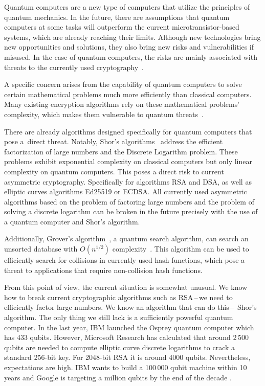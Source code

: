 Quantum computers are a new type of computers that utilize the principles of quantum mechanics. In the future, there are assumptions that quantum computers at some tasks will outperform the current microtransistor-based systems, which are already reaching their limits. Although new technologies bring new opportunities and solutions, they also bring new risks and vulnerabilities if misused. In the case of quantum computers, the risks are mainly associated with threats to the currently used cryptography~\cite{NUKIB.report}.

A specific concern arises from the capability of quantum computers to solve certain mathematical problems much more efficiently than classical computers. Many existing encryption algorithms rely on these mathematical problems' complexity, which makes them vulnerable to quantum threats~\cite{pqc.survey.7030040}.

There are already algorithms designed specifically for quantum computers that pose a~direct threat. Notably, Shor's algorithms~\cite{shore.alg} address the efficient factorization of large numbers and the Discrete Logarithm problem. These problems exhibit exponential complexity on classical computers but only linear complexity on quantum computers. This poses a direct risk to current asymmetric cryptography. Specifically for algorithms RSA and DSA, as well as elliptic curves algorithms Ed25519 or ECDSA. All currently used asymmetric algorithms based on the problem of factoring large numbers and the problem of solving a discrete logarithm can be broken in the future precisely with the use of a quantum computer and Shor's algorithm.

Additionally, Grover's algorithm~\cite{grover.alg}, a quantum search algorithm, can search an unsorted database with $O(n^{1/2})$  complexity~\cite{pqc.review.10048976}. This algorithm can be used to efficiently search for collisions in currently used hash functions, which pose a threat to applications that require non-collision hash functions.

From this point of view, the current situation is somewhat unusual. We know how to break current cryptographic algorithms such as RSA\,--\,we need to efficiently factor large numbers. We know an algorithm that can do this\,--\, Shor's algorithm. The only thing we still lack is a sufficiently powerful quantum computer. In the last year, IBM launched the Osprey quantum computer which has 433 qubits. However, Microsoft Research has calculated that around 2\,500 qubits are needed to compute elliptic curve discrete logarithms to crack a standard 256-bit key. For 2048-bit RSA it is around 4000 qubits. Nevertheless, expectations are high. IBM wants to build a 100\,000 qubit machine within 10 years and Google is targeting a million qubits by the end of the decade \cite{article.quantum.threat, article.quantum.computing}.

